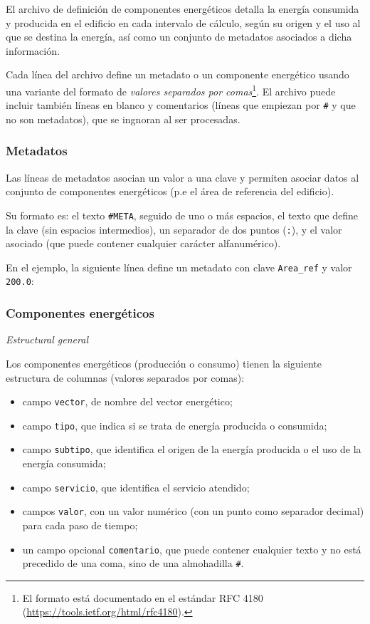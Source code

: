 \documentclass[10pt,notitlepage,oneside,a4paper]{article}
\begin{document}
El archivo de definición de componentes energéticos detalla la energía consumida y producida en el edificio en cada intervalo de cálculo, según su origen y el uso al que se destina la energía, así como un conjunto de metadatos asociados a dicha información.

Cada línea del archivo define un metadato o un componente energético usando una variante del formato de \textit{valores separados por comas}\footnote{El formato está documentado en el estándar RFC 4180 (\url{https://tools.ietf.org/html/rfc4180}).}. El archivo puede incluir también líneas en blanco y comentarios (líneas que empiezan por \texttt{\#} y que no son metadatos), que se ingnoran al ser procesadas.



\subsubsection{Metadatos}

Las líneas de metadatos asocian un valor a una clave y permiten asociar datos al conjunto de componentes energéticos (p.e el área de referencia del edificio).

Su formato es: el texto \texttt{\#META}, seguido de uno o más espacios, el texto que define la clave (sin espacios intermedios), un separador de dos puntos (\texttt{:}), y el valor asociado (que puede contener cualquier carácter alfanumérico).

En el ejemplo, la siguiente línea define un metadato con clave \texttt{Area\_ref} y valor \texttt{200.0}:



\subsubsection{Componentes energéticos}\label{sec:componentesenergeticos}

\textit{Estructural general}

Los componentes energéticos (producción o consumo) tienen la siguiente estructura de columnas (valores separados por comas):

\begin{itemize}
\item campo \texttt{vector}, de nombre del vector energético;
\item campo \texttt{tipo}, que indica si se trata de energía producida o consumida;
\item campo \texttt{subtipo}, que identifica el origen de la energía producida o el uso de la energía consumida;
\item campo \texttt{servicio}, que identifica el servicio atendido;
\item campos \texttt{valor}, con un valor numérico (con un punto como separador decimal) para cada paso de tiempo;
\item un campo opcional \texttt{comentario}, que puede contener cualquier texto y no está precedido de una coma, sino de una almohadilla \texttt{\#}.
\end{itemize}
\end{document}
